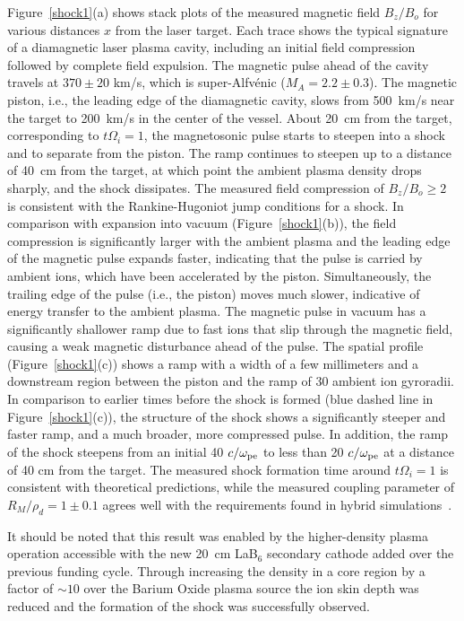 \documentclass[11pt]{article}
\renewcommand{\cite}{\citep}
\begin{document}
Figure~\ref{shock1}(a) shows stack plots of the measured magnetic field
$B_z/B_o$ for various
distances $x$ from the laser target. Each trace shows the typical
signature of a diamagnetic laser plasma cavity, including an initial
field compression followed by complete field expulsion. The magnetic
pulse ahead of the cavity travels at $370 \pm 20$ km/s, which is
super-Alfvénic ($M_A = 2.2 \pm 0.3$). The magnetic
piston, i.e., the leading edge of the diamagnetic cavity, slows from
500~km/s near the target to 200~km/s in the center of the vessel. About 20~cm from the target, corresponding to
$t \Omega_{i} =1$, the magnetosonic pulse starts to
steepen into a shock and to separate from the piston. The ramp continues
to steepen up to a distance of 40~cm from the target, at which point the
ambient plasma density drops sharply, and the shock dissipates. The
measured field compression of $B_z/B_o \ge 2$ is consistent
with the Rankine-Hugoniot jump conditions for a shock. In comparison
with expansion into vacuum (Figure~\ref{shock1}(b)), the field compression is
significantly larger with the ambient plasma and the leading edge of the
magnetic pulse expands faster, indicating that the pulse is carried by
ambient ions, which have been accelerated by the piston. Simultaneously,
the trailing edge of the pulse (i.e., the piston) moves much slower,
indicative of energy transfer to the ambient plasma. The magnetic pulse
in vacuum has a significantly shallower ramp due to fast ions that slip
through the magnetic field, causing a weak magnetic disturbance ahead of
the pulse. The spatial profile (Figure~\ref{shock1}(c)) shows a ramp with a width of
a few millimeters and a downstream region between the piston and the
ramp of 30 ambient ion gyroradii. In comparison to earlier times before
the shock is formed (blue dashed line in Figure~\ref{shock1}(c)), the structure of
the shock shows a significantly steeper and faster ramp, and a much
broader, more compressed pulse. In addition, the ramp of the shock
steepens from an initial 40 $c/\omega_{\rm pe}$ to less
than 20 $c/\omega_{\rm pe}$ at a distance of 40 cm from
the target. The measured shock formation time around
$t \Omega_{i} = 1$ is consistent with theoretical
predictions, while the measured coupling parameter of
$R_M/\rho_d = 1 \pm 0.1$ agrees
well with the requirements found in hybrid simulations~\cite{clark:2014}.

It should be noted that this result was enabled by the higher-density
plasma operation accessible with the new 20~cm LaB$_6$ secondary
cathode added over the previous funding cycle.  Through increasing the
density in a core region by a factor of $\sim 10$ over the Barium
Oxide plasma source the ion skin depth was reduced and the formation
of the shock was successfully observed.
\end{document}
